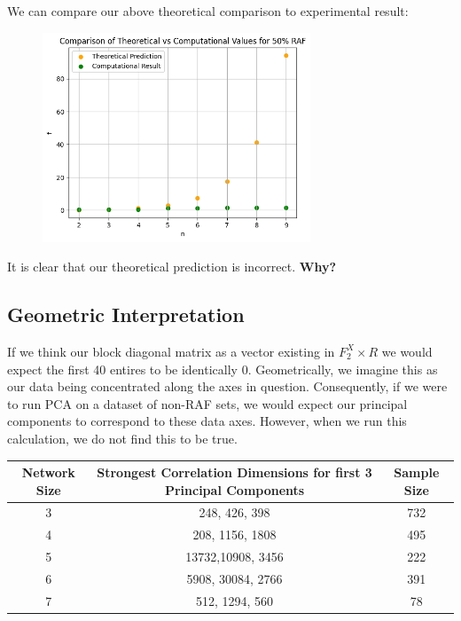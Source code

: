 \documentclass{article}
\begin{document}
We can compare our above theoretical comparison to experimental result:

\begin{figure}[h]%
    \centering
    \includegraphics[width=8cm]{f_pred} 
\end{figure}

It is clear that our theoretical prediction is incorrect. \textbf{Why?}


\subsection{Geometric Interpretation}

If we think our block diagonal matrix as a vector existing in $F_2^X \times R$ we would expect the first 40 entires to be identically 0.
Geometrically, we imagine this as our data being concentrated along the axes in question.
Consequently, if we were to run PCA on a dataset of non-RAF sets, we would expect our principal components to correspond to these data axes. 
However, when we run this calculation, we do not find this to be true. 



\begin{center}
    \begin{tabular}{ | c || c| c|} 
      \hline
      \textbf{Network Size} & \textbf{Strongest Correlation Dimensions for first 3 Principal Components} & \textbf{Sample Size} \\ 
      \hline
      3 &  248, 426, 398 & 732 \\ 
      4 &  208, 1156, 1808 &  495\\ 
      5 &  13732,10908, 3456 &  222\\ 
      6 &  5908, 30084, 2766 &  391\\ 
      7 &  512, 1294, 560 &  78\\ 
      \hline
\end{tabular}
\end{center}
\end{document}

